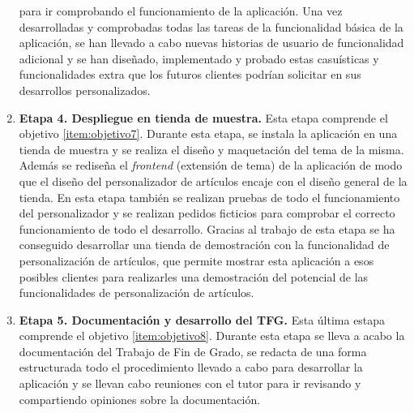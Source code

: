 \documentclass[12pt]{article}
\begin{document}
\begin{enumerate}[label={\textbf{\textbullet}}]
    para ir comprobando el funcionamiento de la aplicación. Una vez desarrolladas y comprobadas todas las tareas de la funcionalidad básica de la aplicación, se han llevado a cabo nuevas historias de usuario de funcionalidad adicional y se han diseñado, implementado y probado estas casuísticas y funcionalidades
    extra que los futuros clientes podrían solicitar en sus desarrollos personalizados.
    \item \textbf{Etapa 4. Despliegue en tienda de muestra.} Esta etapa comprende el objetivo \ref{item:objetivo7}. 
    Durante esta etapa, se instala la aplicación en una tienda de muestra y se realiza el diseño y maquetación del tema de la misma. Además se rediseña el \textit{frontend} (extensión de tema) de la aplicación de modo que el diseño del personalizador de artículos
    encaje con el diseño general de la tienda. En esta etapa también se realizan pruebas de todo el funcionamiento del personalizador y se realizan pedidos ficticios para comprobar el correcto
    funcionamiento de todo el desarrollo. Gracias al trabajo de esta etapa se ha conseguido desarrollar una tienda de demostración con la funcionalidad de personalización de artículos, que permite
    mostrar esta aplicación a esos posibles clientes para realizarles una demostración del potencial de las funcionalidades de personalización de artículos.
    \item \textbf{Etapa 5. Documentación y desarrollo del TFG.} Esta última estapa comprende el objetivo \ref{item:objetivo8}. Durante esta etapa
    se lleva a acabo la documentación del Trabajo de Fin de Grado, se redacta de una forma estructurada todo el procedimiento llevado a cabo para desarrollar
    la aplicación y se llevan cabo reuniones con el tutor para ir revisando y compartiendo opiniones sobre la documentación.
\end{enumerate}
\end{document}
